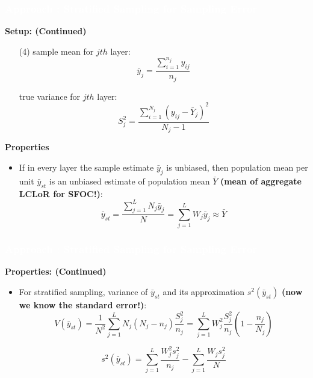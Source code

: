 \documentclass{beamer}	%
\theoremstyle{plain}
\theoremstyle{definition}
\theoremstyle{remark}
\numberwithin{equation}{section}
\begin{document}
\begin{frame}
\frametitle{\textcolor{white}{Approach \uppercase\expandafter{} : Stratified Sampling for Sampling Error}}
\small
\textbf{Setup: (Continued)}

\begin{itemize}
	\scriptsize
	\item[(4)]sample mean for $j th$ layer:
	\begin{equation}
	\bar{y}_{j}=\frac{\sum_{i=1}^{n_{j}} y_{i j}}{n_{j}}
	\end{equation}
	
	true variance for $j th$ layer:
	\begin{equation}
	S_{j}^{2}=\frac{\sum_{i=1}^{N_{j}}\left(y_{i j}-\bar{Y}_{j}\right)^{2}}{N_{j}-1}
	\end{equation}
\end{itemize}

\textbf{Properties}

\begin{itemize}
	\scriptsize
	\item If in every layer the sample estimate $\bar{y}_{j}$ is unbiased, then population mean per unit $\bar{y}_{s t}$ is an unbiased estimate of population mean $\bar{Y}$ \textbf{(mean of aggregate LCLoR for SFOC!)}: 
	\begin{equation}
	\bar{y}_{s t}=\frac{\sum_{j=1}^{L} N_{j} \bar{y}_{j}}{N}=\sum_{j=1}^{L} W_{j} \bar{y}_{j} \approx \bar{Y}
	\end{equation}
	
\end{itemize}

\end{frame}

\begin{frame}

\frametitle{\textcolor{white}{Approach \uppercase\expandafter{} : Stratified Sampling for Sampling Error}}
\small
\textbf{Properties: (Continued)}

\begin{itemize}
	\scriptsize
	
	\item For stratified sampling, variance of $\bar{y}_{s t}$ and its approximation $s^{2}\left(\bar{y}_{s t}\right)$ \textbf{(now we know the standard error!)}:
	\begin{equation}
	V\left(\bar{y}_{s t}\right)=\frac{1}{N^{2}} \sum_{j=1}^{L} N_{j}\left(N_{j}-n_{j}\right) \frac{S_{j}^{2}}{n_{j}}=\sum_{j=1}^{L} W_{j}^{2} \frac{S_{j}^{2}}{n_{j}}\left(1-\frac{n_{j}}{N_{j}}\right)
	\end{equation}
	
	\begin{equation}
s^{2}\left(\bar{y}_{s t}\right)=\sum_{j=1}^{L} \frac{W_{j}^{2} s_{j}^{2}}{n_{j}}-\sum_{j=1}^{L} \frac{W_{j} s_{j}^{2}}{N}
	\end{equation}
\end{itemize}

\end{frame}
\end{document}
